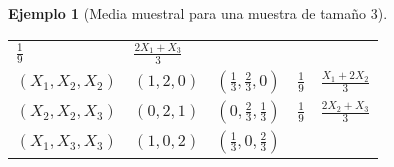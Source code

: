 \documentclass[
]{book}
\theoremstyle{break}
\theoremstyle{definition}
\theoremstyle{definition}
\newtheorem{example}{Ejemplo}[chapter]
\theoremstyle{definition}
\theoremstyle{remark}
\begin{document}
\begin{example}[Media muestral para una muestra de tamaño 3]
\begin{longtable}[]{@{}lllll@{}}
\begin{minipage}[t]{0.17\columnwidth}
\(\frac{1}{9}\)\strut
\end{minipage} & \begin{minipage}[t]{0.18\columnwidth}\raggedright
\(\frac{2X_1+X_3}{3}\)\strut
\end{minipage}\tabularnewline
\begin{minipage}[t]{0.18\columnwidth}\raggedright
\(\left( X_1,X_2,X_2 \right)\)\strut
\end{minipage} & \begin{minipage}[t]{0.16\columnwidth}\raggedright
\(\left( 1,2,0 \right)\)\strut
\end{minipage} & \begin{minipage}[t]{0.16\columnwidth}\raggedright
\(\left( \frac{1}{3},\frac{2}{3},0 \right)\)\strut
\end{minipage} & \begin{minipage}[t]{0.17\columnwidth}\raggedright
\(\frac{1}{9}\)\strut
\end{minipage} & \begin{minipage}[t]{0.18\columnwidth}\raggedright
\(\frac{X_1+2X_2}{3}\)\strut
\end{minipage}\tabularnewline
\begin{minipage}[t]{0.18\columnwidth}\raggedright
\(\left( X_2,X_2,X_3 \right)\)\strut
\end{minipage} & \begin{minipage}[t]{0.16\columnwidth}\raggedright
\(\left( 0,2,1 \right)\)\strut
\end{minipage} & \begin{minipage}[t]{0.16\columnwidth}\raggedright
\(\left( 0,\frac{2}{3},\frac{1}{3} \right)\)\strut
\end{minipage} & \begin{minipage}[t]{0.17\columnwidth}\raggedright
\(\frac{1}{9}\)\strut
\end{minipage} & \begin{minipage}[t]{0.18\columnwidth}\raggedright
\(\frac{2X_2+X_3}{3}\)\strut
\end{minipage}\tabularnewline
\begin{minipage}[t]{0.18\columnwidth}\raggedright
\(\left( X_1,X_3,X_3 \right)\)\strut
\end{minipage} & \begin{minipage}[t]{0.16\columnwidth}\raggedright
\(\left( 1,0,2 \right)\)\strut
\end{minipage} & \begin{minipage}[t]{0.16\columnwidth}\raggedright
\(\left( \frac{1}{3},0,\frac{2}{3} \right)\)\strut

\end{minipage}
\end{longtable}
\end{example}
\end{document}
